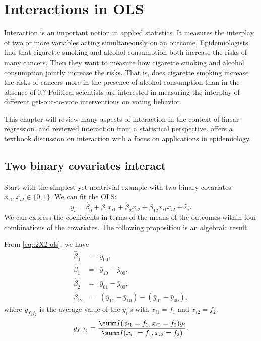 
\chapter{Interactions in OLS}\label{chapter::interaction}
 
 Interaction is an important notion in applied statistics. It measures the interplay of two or more variables acting simultaneously on an outcome. Epidemiologists find that cigarette smoking and alcohol consumption both increase the risks of many cancers. Then they want to measure how cigarette smoking and alcohol consumption jointly increase the risks. That is, does cigarette smoking increase the risks of cancers more in the presence of alcohol consumption than in the absence of it? Political scientists are interested in measuring the interplay of different get-out-to-vote interventions on voting behavior. 
 
 
 This chapter will review many aspects of interaction in the context of linear regression. \citet{Cox:1984tx} and \citet{berrington2007interpretation} reviewed interaction from a statistical perspective. \citet{Vanderweele::2015} offers a textbook discussion on interaction with a focus on applications in epidemiology. 
 
 
 
  
\section{Two binary covariates interact} 

Start with the simplest yet nontrivial example with two binary covariates $x_{i1}, x_{i2} \in \{0, 1\}$. We can fit the OLS:
\begin{equation}
\label{eq::2X2-ols}
y_i=\hat{\beta}_{0}+\hat{\beta}_{1} x_{i1}+\hat{\beta}_{2} x_{i2}+\hat{\beta}_{12} x_{i1} x_{i2}+\hat{\varepsilon}_i. 
\end{equation}
We can express the coefficients in terms of the means of the outcomes within four combinations of the covariates. The following proposition
is an algebraic result.


\begin{proposition}\label{proposition::2X2-ols}
From \eqref{eq::2X2-ols}, we have
\begin{eqnarray*} 
\hat{\beta}_{0} &=& \bar{y}_{00}, \\
\hat{\beta}_{1} &=& \bar{y}_{10} - \bar{y}_{00}, \\
\hat{\beta}_{2} &=& \bar{y}_{01}-\bar{y}_{00}, \\
\hat{\beta}_{12} &=& (\bar{y}_{11}-\bar{y}_{10})-(\bar{y}_{01}-\bar{y}_{00}),   
\end{eqnarray*} 
where $\bar{y}_{f_{1}f_{2}}$ is the average value of the $y_{i}$'s
with $x_{i1} = f_{1}$ and $x_{i2} = f_{2}$:
$$
\bar{y}_{f_{1}f_{2}} = \frac{ \sumn I(x_{i1} = f_{1}, x_{i2} = f_{2}) y_i }{\sumn I(x_{i1} = f_{1}, x_{i2} = f_{2})}.
$$
\end{proposition}

